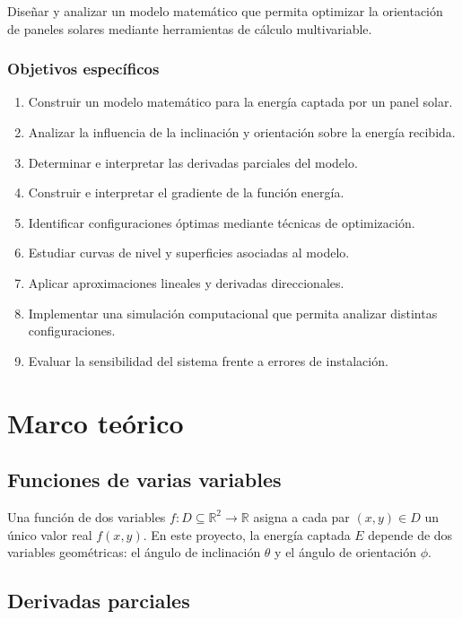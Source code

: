 \documentclass[12pt,a4paper]{article}
\begin{document}
Diseñar y analizar un modelo matemático que permita optimizar la orientación de paneles solares mediante herramientas de cálculo multivariable.

\subsubsection{Objetivos específicos}

\begin{enumerate}
    \item Construir un modelo matemático para la energía captada por un panel solar.
    \item Analizar la influencia de la inclinación y orientación sobre la energía recibida.
    \item Determinar e interpretar las derivadas parciales del modelo.
    \item Construir e interpretar el gradiente de la función energía.
    \item Identificar configuraciones óptimas mediante técnicas de optimización.
    \item Estudiar curvas de nivel y superficies asociadas al modelo.
    \item Aplicar aproximaciones lineales y derivadas direccionales.
    \item Implementar una simulación computacional que permita analizar distintas configuraciones.
    \item Evaluar la sensibilidad del sistema frente a errores de instalación.
\end{enumerate}

\section{Marco teórico}

\subsection{Funciones de varias variables}

Una función de dos variables $f: D \subseteq \mathbb{R}^2 \to \mathbb{R}$ asigna a cada par $(x,y) \in D$ un único valor real $f(x,y)$. En este proyecto, la energía captada $E$ depende de dos variables geométricas: el ángulo de inclinación $\theta$ y el ángulo de orientación $\phi$.

\subsection{Derivadas parciales}
\end{document}
